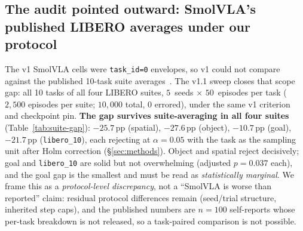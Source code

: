 \documentclass[10pt]{article}
\begin{document}
\subsection{The audit pointed outward: SmolVLA's published LIBERO
averages under our protocol}
\label{sec:suite-audit}
The v1 SmolVLA cells were \texttt{task\_id=0} envelopes, so v1 could not
compare against the published 10-task suite
averages~\cite{shukor2025smolvla}. The v1.1 sweep closes that scope gap:
all 10 tasks of all four LIBERO suites, $5$~seeds $\times$ $50$~episodes
per task ($2{,}500$ episodes per suite; $10{,}000$ total, 0 errored),
under the same v1 criterion and checkpoint pin. \textbf{The gap survives
suite-averaging in all four suites}
(Table~\ref{tab:suite-gap}): $-25.7$\,pp (spatial), $-27.6$\,pp (object),
$-10.7$\,pp (goal), $-21.7$\,pp (\texttt{libero\_10}), each rejecting at
$\alpha{=}0.05$ with the task as the sampling unit after Holm correction
(\S\ref{sec:methods}). Object and spatial reject decisively; goal and
\texttt{libero\_10} are solid but not overwhelming (adjusted
$p{=}0.037$ each), and the goal gap is the smallest and must be read as
\emph{statistically marginal}. We frame this as a \emph{protocol-level
discrepancy}, not a ``SmolVLA is worse than reported'' claim: residual
protocol differences remain (seed/trial structure, inherited step caps),
and the published
numbers are $n{=}100$ self-reports whose per-task breakdown is not
released, so a task-paired comparison is not possible.
\end{document}
